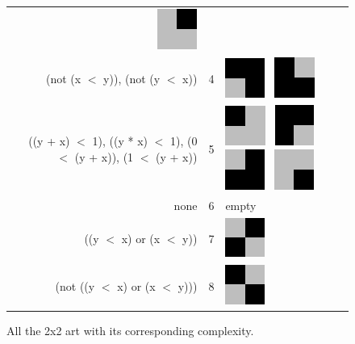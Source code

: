 \documentclass[11pt]{article}
\begin{document}
{\begin{figure}
\begin{center}
\begin{tabular}{r c l}
    \includegraphics[width=.25in]{../presentation/2x2/Shape4LVL3.png}\\
\tiny{(not (x $<$ y)), (not (y $<$ x))} & 4 & 
    \includegraphics[width=.25in]{../presentation/2x2/Shape2LVL4.png}~
    \includegraphics[width=.25in]{../presentation/2x2/Shape1LVL4.png} \\
\tiny{((y + x) $<$ 1), ((y * x) $<$ 1), (0 $<$ (y + x)), (1 $<$ (y + x))} & 5 & 
    \includegraphics[width=.25in]{../presentation/2x2/Shape2LVL5.png}~
    \includegraphics[width=.25in]{../presentation/2x2/Shape1LVL5.png}~
    \includegraphics[width=.25in]{../presentation/2x2/Shape3LVL5.png}~
    \includegraphics[width=.25in]{../presentation/2x2/Shape4LVL5.png} \\
\tiny{none} & 6 & empty \\
\tiny{((y $<$ x) or (x $<$ y))} & 7 &
    \includegraphics[width=.25in]{../presentation/2x2/Shape1LVL7.png}\\
\tiny{(not ((y $<$ x) or (x $<$ y)))} & 8 &
    \includegraphics[width=.25in]{../presentation/2x2/Shape1LVL8.png}
\end{tabular}
\end{center}

\caption{All the 2x2 art with its corresponding complexity.}
\end{figure}


}
\end{document}
